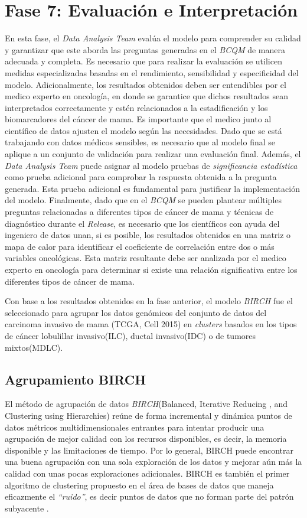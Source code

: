 \section{Fase 7: Evaluación e Interpretación}
En esta fase, el \textit{Data Analysis Team} evalúa el modelo para comprender su calidad y garantizar que este aborda las preguntas generadas en el \textit{BCQM} de manera adecuada y completa. Es necesario que para realizar la evaluación se utilicen medidas especializadas basadas en el rendimiento, sensibilidad y especificidad del modelo. Adicionalmente, los resultados obtenidos deben ser entendibles por el medico experto en oncología, en donde se garantice que dichos resultados sean interpretados correctamente y estén relacionados a la estadificación y los biomarcadores del cáncer de mama. Es importante que el medico junto al científico de datos ajusten el modelo según las necesidades. Dado que se está trabajando con datos médicos sensibles, es necesario que al modelo final se aplique a un conjunto de validación para realizar una evaluación final. Además, el \textit{Data Analysis Team} puede asignar al modelo pruebas de \textit{significancia estadística} como prueba adicional para comprobar la respuesta obtenida a la pregunta generada. Esta prueba adicional es fundamental para justificar la implementación del modelo. Finalmente, dado que en el \textit{BCQM} se pueden plantear múltiples preguntas relacionadas a diferentes tipos de cáncer de mama y técnicas de diagnóstico durante el \textit{Release}, es necesario que los científicos con ayuda del ingeniero de datos unan, si es posible, los resultados obtenidos en una matriz o mapa de calor para identificar el coeficiente de correlación entre dos o más variables oncológicas. Esta matriz resultante debe ser analizada por el medico experto en oncología para determinar si existe una relación significativa entre los diferentes tipos de cáncer de mama.

Con base a los resultados obtenidos en la fase anterior, el modelo \textit{BIRCH} fue el seleccionado para agrupar los datos genómicos del conjunto de datos del carcinoma invasivo de mama (TCGA, Cell 2015) en \textit{clusters} basados en los tipos de cáncer lobulillar invasivo(ILC), ductal invasivo(IDC) o de tumores mixtos(MDLC).

\subsection{Agrupamiento BIRCH}
El método de agrupación de datos \textit{BIRCH}(Balanced, Iterative Reducing , and Clustering using Hierarchies) reúne de forma incremental y dinámica puntos de datos métricos multidimensionales entrantes para intentar producir una agrupación de mejor calidad con los recursos disponibles, es decir, la memoria disponible y las limitaciones de tiempo. Por lo general, BIRCH puede encontrar una buena agrupación con una sola exploración de los datos y mejorar aún más la calidad con unas pocas exploraciones adicionales. BIRCH es también el primer algoritmo de clustering propuesto en el área de bases de datos que maneja eficazmente el \textit{“ruido”}, es decir puntos de datos que no forman parte del patrón subyacente \cite{Zhang1996}. 

